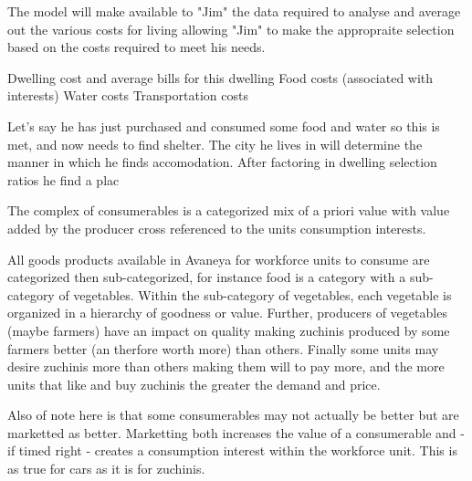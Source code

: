 The model will make available to "Jim" the data required to analyse and average out the various costs for living allowing "Jim" to make the appropraite selection based on the costs required to meet his needs.

Dwelling cost and average bills for this dwelling
Food costs (associated with interests)
Water costs
Transportation costs 




Let's say he has just purchased and consumed some food and water so this is met, and now needs to find shelter. The city he lives in will determine the manner in which he finds accomodation. After factoring in dwelling selection ratios he find a plac








The complex of consumerables is a categorized mix of a priori value with value added by the producer cross referenced to the units consumption interests.

All goods products available in Avaneya for workforce units to consume are categorized then sub-categorized, for instance food is a category with a sub-category of vegetables. Within the sub-category of vegetables, each vegetable is organized in a hierarchy of goodness or value. Further, producers of vegetables (maybe farmers) have an impact on quality making zuchinis produced by some farmers better (an therfore worth more) than others. Finally some units may desire zuchinis more than others making them will to pay more, and the more units that like and buy zuchinis the greater the demand and price.

Also of note here is that some consumerables may not actually be better but are marketted as better. Marketting both increases the value of a consumerable and - if timed right - creates a consumption interest within the workforce unit. This is as true for cars as it is for zuchinis.   

